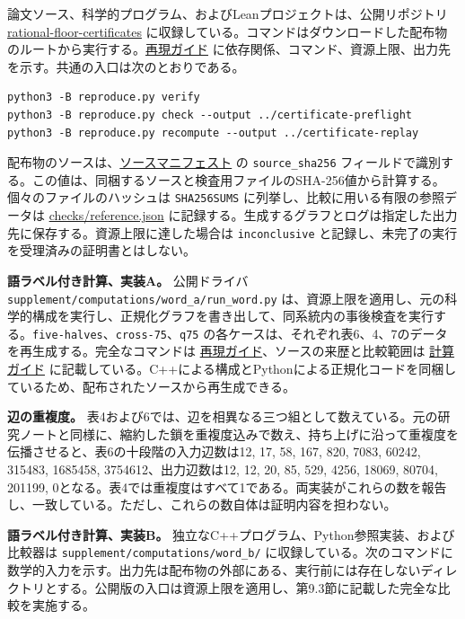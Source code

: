 \documentclass[11pt,reqno]{amsart}
\theoremstyle{definition}
\theoremstyle{definition}
\theoremstyle{remark}
\begin{document}
論文ソース、科学的プログラム、およびLeanプロジェクトは、公開リポジトリ \href{https://github.com/ixixi/rational-floor-certificates}{rational-floor-certificates} に収録している。コマンドはダウンロードした配布物のルートから実行する。\href{REPRODUCE.md}{再現ガイド} に依存関係、コマンド、資源上限、出力先を示す。共通の入口は次のとおりである。

\begin{Verbatim}[fontsize=\small,breaklines=true,breakanywhere=true]
python3 -B reproduce.py verify
python3 -B reproduce.py check --output ../certificate-preflight
python3 -B reproduce.py recompute --output ../certificate-replay
\end{Verbatim}

配布物のソースは、\href{MANIFEST.json}{ソースマニフェスト} の \nolinkurl{source_sha256} フィールドで識別する。この値は、同梱するソースと検査用ファイルのSHA-256値から計算する。個々のファイルのハッシュは \nolinkurl{SHA256SUMS} に列挙し、比較に用いる有限の参照データは \href{checks/reference.json}{checks/reference.json} に記録する。生成するグラフとログは指定した出力先に保存する。資源上限に達した場合は \nolinkurl{inconclusive} と記録し、未完了の実行を受理済みの証明書とはしない。

\textbf{語ラベル付き計算、実装A。} 公開ドライバ \nolinkurl{supplement/computations/word_a/run_word.py} は、資源上限を適用し、元の科学的構成を実行し、正規化グラフを書き出して、同系統内の事後検査を実行する。\nolinkurl{five-halves}、\nolinkurl{cross-75}、\nolinkurl{q75} の各ケースは、それぞれ表6、4、7のデータを再生成する。完全なコマンドは \href{REPRODUCE.md}{再現ガイド}、ソースの来歴と比較範囲は \href{supplement/COMPUTATION.md}{計算ガイド} に記載している。C++による構成とPythonによる正規化コードを同梱しているため、配布されたソースから再生成できる。

\textbf{辺の重複度。} 表4および6では、辺を相異なる三つ組として数えている。元の研究ノートと同様に、縮約した鎖を重複度込みで数え、持ち上げに沿って重複度を伝播させると、表6の十段階の入力辺数は12, 17, 58, 167, 820, 7083, 60242, 315483, 1685458, 3754612、出力辺数は12, 12, 20, 85, 529, 4256, 18069, 80704, 201199, 0となる。表4では重複度はすべて1である。両実装がこれらの数を報告し、一致している。ただし、これらの数自体は証明内容を担わない。

\textbf{語ラベル付き計算、実装B。} 独立なC++プログラム、Python参照実装、および比較器は \nolinkurl{supplement/computations/word_b/} に収録している。次のコマンドに数学的入力を示す。出力先は配布物の外部にある、実行前には存在しないディレクトリとする。公開版の入口は資源上限を適用し、第9.3節に記載した完全な比較を実施する。
\end{document}
